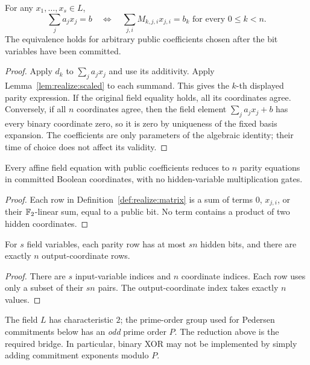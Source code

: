 \begin{theorem}\label{thm:realize:affine-to-parity}
For any $x_1,\ldots,x_s\in L$,
\[
 \boxed{\sum_ja_jx_j=b
 \quad\Longleftrightarrow\quad
 \sum_{j,i}M_{k,j,i}x_{j,i}=b_k
 \text{ for every }0\le k<n.}
\]
The equivalence holds for arbitrary public coefficients
chosen after the bit variables have been committed.
\end{theorem}
\begin{proof}
Apply $d_k$ to $\sum_ja_jx_j$ and use its additivity.
Apply Lemma~\ref{lem:realize:scaled} to each summand.
This gives the $k$-th displayed parity expression.
If the original field equality holds, all its coordinates agree.
Conversely, if all $n$ coordinates agree, then the field element
$\sum_ja_jx_j+b$ has every binary coordinate zero, so it is zero
by uniqueness of the fixed basis expansion.
The coefficients are only parameters of the algebraic identity;
their time of choice does not affect its validity.
\end{proof}

\begin{corollary}\label{cor:realize:linear-gates}
Every affine field equation with public coefficients reduces
to $n$ parity equations in committed Boolean coordinates,
with no hidden-variable multiplication gates.
\end{corollary}
\begin{proof}
Each row in Definition~\ref{def:realize:matrix}
is a sum of terms $0$, $x_{j,i}$, or their
$\mathbb{F}_2$-linear sum, equal to a public bit.
No term contains a product of two hidden coordinates.
\end{proof}

\begin{lemma}\label{lem:realize:row-weight}
For $s$ field variables, each parity row has at most $sn$
hidden bits, and there are exactly $n$ output-coordinate rows.
\end{lemma}
\begin{proof}
There are $s$ input-variable indices and $n$ coordinate
indices. Each row uses only a subset of their $sn$ pairs.
The output-coordinate index takes exactly $n$ values.
\end{proof}

\begin{remark}
The field $L$ has characteristic $2$; the prime-order group
used for Pedersen commitments below has an \emph{odd} prime
order $P$. The reduction above is the required bridge.
In particular, binary XOR may not be implemented by simply
adding commitment exponents modulo $P$.
\end{remark}

